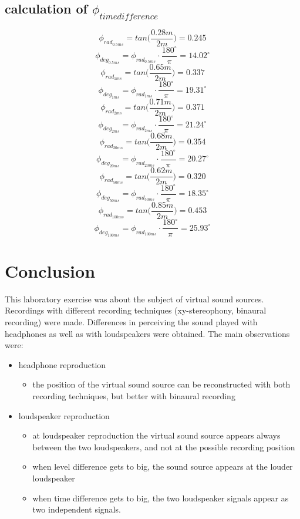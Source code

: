 \documentclass{article}
\begin{document}
\subsection{calculation of $\phi_{timedifference}$}
$$\phi_{rad_{0.5ms}}=tan\bigg(\frac{0.28m}{2m}\bigg)=0.245$$
$$\phi_{deg_{0.5ms}}=\phi_{rad_{0.5ms}}\cdot\frac{180^\circ}{\pi}=14.02^\circ$$
$$\phi_{rad_{1ms}}=tan\bigg(\frac{0.65m}{2m}\bigg)=0.337$$
$$\phi_{deg_{1ms}}=\phi_{rad_{1ms}}\cdot\frac{180^\circ}{\pi}=19.31^\circ$$
$$\phi_{rad_{2ms}}=tan\bigg(\frac{0.71m}{2m}\bigg)=0.371$$
$$\phi_{deg_{2ms}}=\phi_{rad_{2ms}}\cdot\frac{180^\circ}{\pi}=21.24^\circ$$
$$\phi_{rad_{20ms}}=tan\bigg(\frac{0.68m}{2m}\bigg)=0.354$$
$$\phi_{deg_{20ms}}=\phi_{rad_{20ms}}\cdot\frac{180^\circ}{\pi}=20.27^\circ$$
$$\phi_{rad_{50ms}}=tan\bigg(\frac{0.62m}{2m}\bigg)=0.320$$
$$\phi_{deg_{50ms}}=\phi_{rad_{50ms}}\cdot\frac{180^\circ}{\pi}=18.35^\circ$$
$$\phi_{rad_{100ms}}=tan\bigg(\frac{0.85m}{2m}\bigg)=0.453$$
$$\phi_{deg_{100ms}}=\phi_{rad_{100ms}}\cdot\frac{180^\circ}{\pi}=25.93^\circ$$

\newpage
\section{Conclusion}
This laboratory exercise was about the subject of virtual sound sources. Recordings with different recording techniques (xy-stereophony, binaural recording) were made. Differences in perceiving the sound played with headphones as well as with loudspeakers were obtained. The main observations were:
\begin{itemize}
\item headphone reproduction
\begin{itemize}
\item the position of the virtual sound source can be reconstructed with both recording techniques, but better with binaural recording
\end{itemize}
\item loudspeaker reproduction
\begin{itemize}
\item at loudspeaker reproduction the virtual sound source appears always between the two loudspeakers, and not at the possible recording position
\item when level difference gets to big, the sound source appears at the louder loudspeaker
\item when time difference gets to big, the two loudspeaker signals appear as two independent signals.
\end{itemize}
\end{itemize}
\newpage
\end{document}
